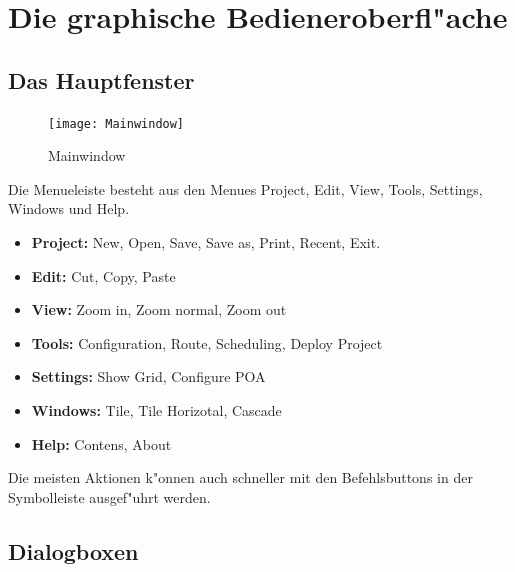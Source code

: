 \documentclass[a4paper,titlepage,12pt,ngerman]{scrbook}
\begin{document}
\chapter{Die graphische Bedieneroberfl"ache}

\section{Das Hauptfenster}
\begin{figure}[htbp]

\begin{center}

\texttt{[image: Mainwindow]}

\caption{Mainwindow}\label{test}

\end{center}

\end{figure}

Die Menueleiste besteht aus den Menues Project, Edit, View, Tools, Settings, Windows und Help.

\begin{itemize}
\item {\bf Project:}	New, Open, Save, Save as, Print, Recent, Exit.
\item {\bf Edit:}	Cut, Copy, Paste
\item {\bf View:}	Zoom in, Zoom normal, Zoom out 
\item {\bf Tools:} 	Configuration, Route, Scheduling, Deploy Project
\item {\bf Settings:}	Show Grid, Configure POA
\item {\bf Windows:} 	Tile, Tile Horizotal, Cascade
\item {\bf Help:} 	Contens, About
\end{itemize}

Die meisten Aktionen k"onnen auch schneller mit den Befehlsbuttons in der Symbolleiste ausgef"uhrt werden.
	
\section{Dialogboxen}
\end{document}
